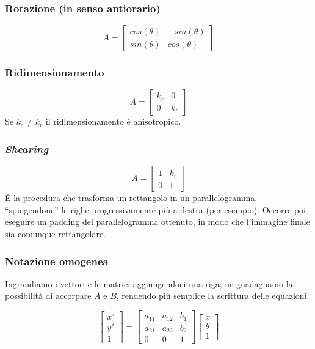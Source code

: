 \documentclass[a4paper,11pt]{article}
\begin{document}
\subsubsection{Rotazione (in senso antiorario)}
\[
A = \begin{bmatrix} cos(\theta) & -sin(\theta) \\ sin(\theta) & cos(\theta) \end{bmatrix}
\]

\subsubsection{Ridimensionamento}
\[
A = \begin{bmatrix} k_r & 0 \\ 0 & k_c \end{bmatrix}
\]
Se $k_c \neq k_r$ il ridimensionamento è anisotropico.

\subsubsection{\textit{Shearing}}
\[
A = \begin{bmatrix} 1 & k_r \\ 0 & 1 \end{bmatrix}
\]
È la procedura che trasforma un rettangolo in un parallelogramma, ``spingendone'' le righe progressivamente più a destra (per esempio). Occorre poi eseguire
un padding del parallelogramma ottenuto, in modo che l'immagine finale sia comunque rettangolare.

\subsubsection{Notazione omogenea}
Ingrandiamo i vettori e le matrici aggiungendoci una riga; ne guadagnamo la possibilità di accorpare $A$ e $B$, rendendo più semplice la
scrittura delle equazioni.

\begin{equation*}
\begin{bmatrix} x' \\ y' \\ 1 \end{bmatrix} = \begin{bmatrix} a_{11} & a_{12} & b_1 \\ a_{21} & a_{22} & b_2 \\ 0 & 0 & 1 \end{bmatrix} \begin{bmatrix} x \\ y \\ 1 \end{bmatrix}
\end{equation*}
\end{document}

